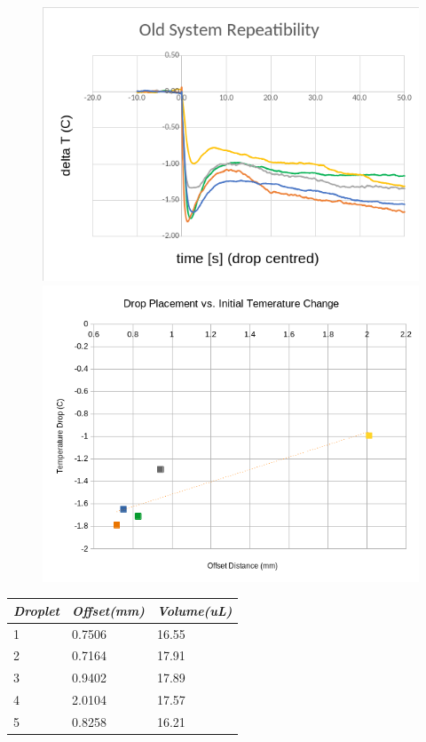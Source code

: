 \begin{figure}[h]
    \begin{center}
        \includegraphics[width=.4\textwidth]{img/drop_temps_2018.png}
        \includegraphics[width=.4\textwidth]{img/2018_pos_temp_trend.png}
    \end{center}
\end{figure}

\begin{table}[h]
    \centering
    \begin{tabular}{|l|l|l|}
    \hline
    \textit{\textbf{Droplet}} & \textit{Offset(mm)} & \textit{Volume(uL)} \\ \hline
    \cellcolor[HTML]{9698ED}1 & 0.7506                             & 16.55                                             \\ \hline
    \cellcolor[HTML]{E9AD3F}2 & 0.7164                             & 17.91                                             \\ \hline
    \cellcolor[HTML]{C0C0C0}3 & 0.9402                             & 17.89                                             \\ \hline
    \cellcolor[HTML]{FFFC9E}4 & 2.0104                             & 17.57                                             \\ \hline
    \cellcolor[HTML]{79CD5D}5 & 0.8258                             & 16.21                                             \\ \hline
    \end{tabular}
    \end{table}

